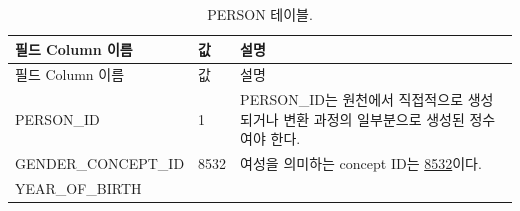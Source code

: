 \documentclass[10.5pt]{book}
\theoremstyle{definition}
\theoremstyle{definition}
\theoremstyle{definition}
\theoremstyle{remark}
\begin{document}
\begin{longtable}[]{@{}lll@{}}
\caption{\label{tab:person} PERSON 테이블.}\tabularnewline
\toprule
\begin{minipage}[b]{0.28\columnwidth}\raggedright\strut
필드 Column 이름\strut
\end{minipage} & \begin{minipage}[b]{0.16\columnwidth}\raggedright\strut
값\strut
\end{minipage} & \begin{minipage}[b]{0.48\columnwidth}\raggedright\strut
설명\strut
\end{minipage}\tabularnewline
\midrule
\endfirsthead
\toprule
\begin{minipage}[b]{0.28\columnwidth}\raggedright\strut
필드 Column 이름\strut
\end{minipage} & \begin{minipage}[b]{0.16\columnwidth}\raggedright\strut
값\strut
\end{minipage} & \begin{minipage}[b]{0.48\columnwidth}\raggedright\strut
설명\strut
\end{minipage}\tabularnewline
\midrule
\endhead
\begin{minipage}[t]{0.28\columnwidth}\raggedright\strut
PERSON\_ID\strut
\end{minipage} & \begin{minipage}[t]{0.16\columnwidth}\raggedright\strut
1\strut
\end{minipage} & \begin{minipage}[t]{0.48\columnwidth}\raggedright\strut
PERSON\_ID는 원천에서 직접적으로 생성되거나 변환 과정의 일부분으로
생성된 정수여야 한다.\strut
\end{minipage}\tabularnewline
\begin{minipage}[t]{0.28\columnwidth}\raggedright\strut
GENDER\_CONCEPT\_ID\strut
\end{minipage} & \begin{minipage}[t]{0.16\columnwidth}\raggedright\strut
8532\strut
\end{minipage} & \begin{minipage}[t]{0.48\columnwidth}\raggedright\strut
여성을 의미하는 concept ID는
\href{http://athena.ohdsi.org/search-terms/terms/8532}{8532}이다.\strut
\end{minipage}\tabularnewline
\begin{minipage}[t]{0.28\columnwidth}\raggedright\strut
YEAR\_OF\_BIRTH\strut
\end{minipage} & \begin{minipage}[t]{0.16\columnwidth}\raggedright\strut

\end{minipage}
\end{longtable}
\end{document}
